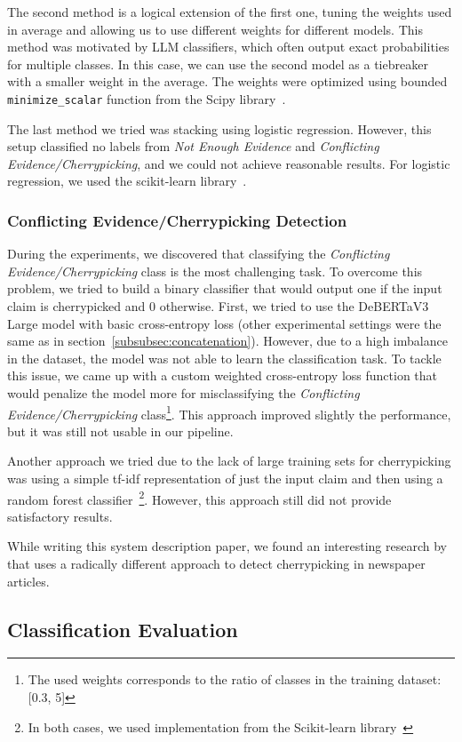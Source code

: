 The second method is a logical extension of the first one, tuning the weights used in average and allowing us to use different weights for different models. This method was motivated by LLM classifiers, which often output exact probabilities for multiple classes. In this case, we can use the second model as a tiebreaker with a smaller weight in the average. The weights were optimized using bounded \texttt{minimize\_scalar} function from the Scipy library~\cite{2020SciPy-NMeth}.

The last method we tried was stacking using logistic regression. However, this setup classified no labels from \textit{Not Enough Evidence} and \textit{Conflicting Evidence/Cherrypicking}, and we could not achieve reasonable results. For logistic regression, we used the scikit-learn library~\cite{scikit-learn}.

\subsubsection*{Conflicting Evidence/Cherrypicking Detection}

During the experiments, we discovered that classifying the \textit{Conflicting Evidence/Cherrypicking} class is the most challenging task. To overcome this problem, we tried to build a binary classifier that would output one if the input claim is cherrypicked and 0 otherwise. First, we tried to use the DeBERTaV3 Large model with basic cross-entropy loss (other experimental settings were the same as in section~\ref{subsubsec:concatenation}). However, due to a high imbalance in the dataset, the model was not able to learn the classification task. To tackle this issue, we came up with a custom weighted cross-entropy loss function that would penalize the model more for misclassifying the \textit{Conflicting Evidence/Cherrypicking} class\footnote{The used weights corresponds to the ratio of classes in the training dataset: [0.3, 5]}. This approach improved slightly the performance, but it was still not usable in our pipeline.

Another approach we tried due to the lack of large training sets for cherrypicking was using a simple tf-idf representation of just the input claim and then using a random forest classifier~\footnote{In both cases, we used implementation from the Scikit-learn library~\cite{scikit-learn}}. However, this approach still did not provide satisfactory results.

While writing this system description paper, we found an interesting research by~\citet{jaradat2024contextawaredetectioncherrypickingnews} that uses a radically different approach to detect cherrypicking in newspaper articles.


\subsection{Classification Evaluation}
